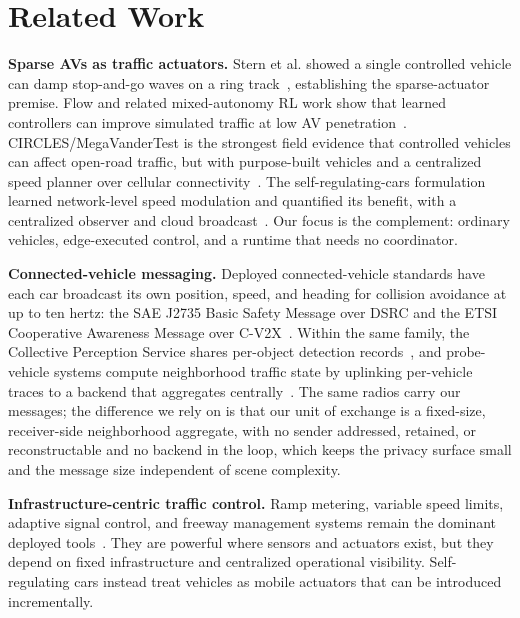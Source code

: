 \section{Related Work}
\label{sec:related}

\noindent\textbf{Sparse AVs as traffic actuators.}
Stern et al. showed a single controlled vehicle can damp stop-and-go waves on a ring track~\cite{stern2018dissipation}, establishing the sparse-actuator premise. Flow and related mixed-autonomy RL work show that learned controllers can improve simulated traffic at low AV penetration~\cite{wu2017flow,vinitsky2018benchmarks,kreidieh2018dissipating}. CIRCLES/MegaVanderTest is the strongest field evidence that controlled vehicles can affect open-road traffic, but with purpose-built vehicles and a centralized speed planner over cellular connectivity~\cite{lee2024traffic}. The self-regulating-cars formulation learned network-level speed modulation and quantified its benefit, with a centralized observer and cloud broadcast~\cite{self_regulating_cars}. Our focus is the complement: ordinary vehicles, edge-executed control, and a runtime that needs no coordinator.

\noindent\textbf{Connected-vehicle messaging.}
Deployed connected-vehicle standards have each car broadcast its own position, speed, and heading for collision avoidance at up to ten hertz: the SAE J2735 Basic Safety Message over DSRC and the ETSI Cooperative Awareness Message over C-V2X~\cite{sae2020j2735,etsi2019cam,kenney2011dedicated}. Within the same family, the Collective Perception Service shares per-object detection records~\cite{etsi2023cpm}, and probe-vehicle systems compute neighborhood traffic state by uplinking per-vehicle traces to a backend that aggregates centrally~\cite{seo2017traffic,herrera2010evaluation}. The same radios carry our messages; the difference we rely on is that our unit of exchange is a fixed-size, receiver-side neighborhood aggregate, with no sender addressed, retained, or reconstructable and no backend in the loop, which keeps the privacy surface small and the message size independent of scene complexity.

\noindent\textbf{Infrastructure-centric traffic control.}
Ramp metering, variable speed limits, adaptive signal control, and freeway management systems remain the dominant deployed tools~\cite{arnold1998ramp,papageorgiou2002freeway,scats,scoot}. They are powerful where sensors and actuators exist, but they depend on fixed infrastructure and centralized operational visibility. Self-regulating cars instead treat vehicles as mobile actuators that can be introduced incrementally.

